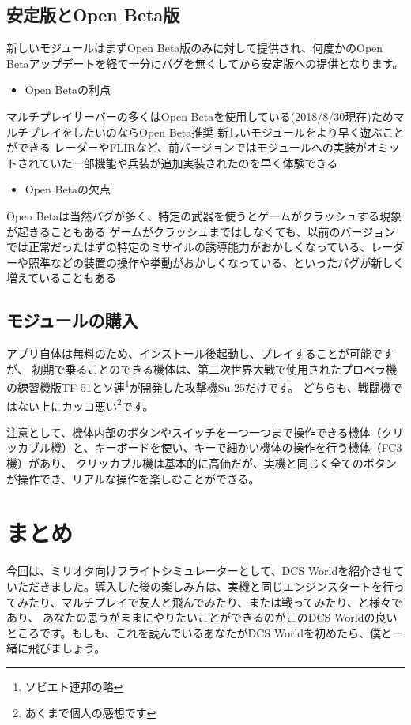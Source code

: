 \subsection{安定版とOpen Beta版}
新しいモジュールはまずOpen Beta版のみに対して提供され、何度かのOpen Betaアップデートを経て十分にバグを無くしてから安定版への提供となります。
\begin{itemize}
  \item Open Betaの利点
\end{itemize}
マルチプレイサーバーの多くはOpen Betaを使用している(2018/8/30現在)ためマルチプレイをしたいのならOpen Beta推奨
新しいモジュールをより早く遊ぶことができる
レーダーやFLIRなど、前バージョンではモジュールへの実装がオミットされていた一部機能や兵装が追加実装されたのを早く体験できる
\begin{itemize}
  \item Open Betaの欠点
\end{itemize}
Open Betaは当然バグが多く、特定の武器を使うとゲームがクラッシュする現象が起きることもある
ゲームがクラッシュまではしなくても、以前のバージョンでは正常だったはずの特定のミサイルの誘導能力がおかしくなっている、レーダーや照準などの装置の操作や挙動がおかしくなっている、といったバグが新しく増えていることもある

\subsection{モジュールの購入}
アプリ自体は無料のため、インストール後起動し、プレイすることが可能ですが、
初期で乗ることのできる機体は、第二次世界大戦で使用されたプロペラ機の練習機版TF-51とソ連\footnote{ソビエト連邦の略}が開発した攻撃機Su-25だけです。
どちらも、戦闘機ではない上にカッコ悪い\footnote{あくまで個人の感想です}です。


注意として、機体内部のボタンやスイッチを一つ一つまで操作できる機体（クリッカブル機）と、キーボードを使い、キーで細かい機体の操作を行う機体（FC3機）があり、
クリッカブル機は基本的に高価だが、実機と同じく全てのボタンが操作でき、リアルな操作を楽しむことができる。

\section{まとめ}
今回は、ミリオタ向けフライトシミュレーターとして、DCS Worldを紹介させていただきました。導入した後の楽しみ方は、実機と同じエンジンスタートを行ってみたり、マルチプレイで友人と飛んでみたり、または戦ってみたり、と様々であり、
あなたの思うがままにやりたいことができるのがこのDCS Worldの良いところです。もしも、これを読んでいるあなたがDCS Worldを初めたら、僕と一緒に飛びましょう。